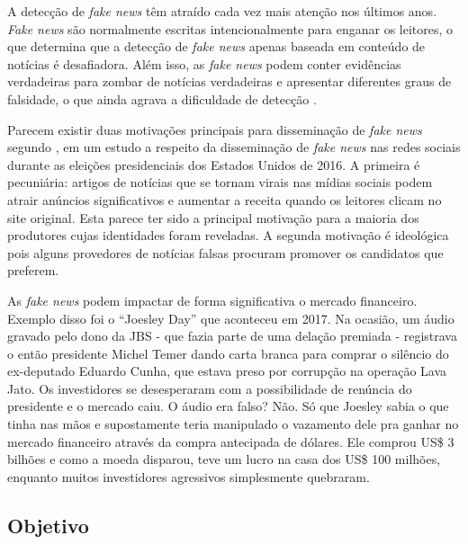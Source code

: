 A  detecção de \textit{fake news} têm atraído cada vez mais atenção nos últimos anos. \textit{Fake news} são normalmente escritas intencionalmente para enganar os leitores, o que determina que a detecção de \textit{fake news} apenas baseada em conteúdo de notícias é desafiadora.
Além isso, as \textit{fake news} podem conter evidências verdadeiras para zombar de notícias verdadeiras e apresentar diferentes graus de falsidade, o que ainda agrava a dificuldade de detecção \cite{karimi2018}. 

Parecem existir duas motivações principais para disseminação de \textit{fake news} segundo \citet{allcot2017}, em um estudo a respeito da disseminação de \textit{fake news} nas redes sociais durante as eleições presidenciais dos Estados Unidos de 2016. 
A primeira é pecuniária: artigos de notícias que se tornam virais nas mídias sociais podem atrair anúncios significativos e aumentar a receita quando os leitores clicam no site original. 
Esta parece ter sido a principal motivação para a maioria dos produtores cujas identidades foram reveladas. 
A segunda motivação é ideológica pois alguns provedores de notícias falsas procuram promover os candidatos que preferem. 

As \textit{fake news} podem impactar de forma significativa o mercado financeiro.
Exemplo disso foi o ``Joesley Day'' \citep{shs2020} que aconteceu em 2017. 
Na ocasião, um áudio gravado pelo dono da JBS - que fazia parte de uma delação premiada - registrava o então presidente Michel Temer dando carta branca para comprar o silêncio do ex-deputado Eduardo Cunha, que estava preso por corrupção na operação Lava Jato.
Os investidores se desesperaram com a possibilidade de renúncia do presidente e o mercado caiu. 
O áudio era falso? Não. 
Só que Joesley sabia o que tinha nas mãos e supostamente teria manipulado o vazamento dele pra ganhar no mercado financeiro através da compra antecipada de dólares. 
Ele comprou US\$ 3 bilhões e como a moeda disparou, teve um lucro na casa dos US\$ 100 milhões, enquanto muitos investidores agressivos simplesmente quebraram.

\subsection{Objetivo}


